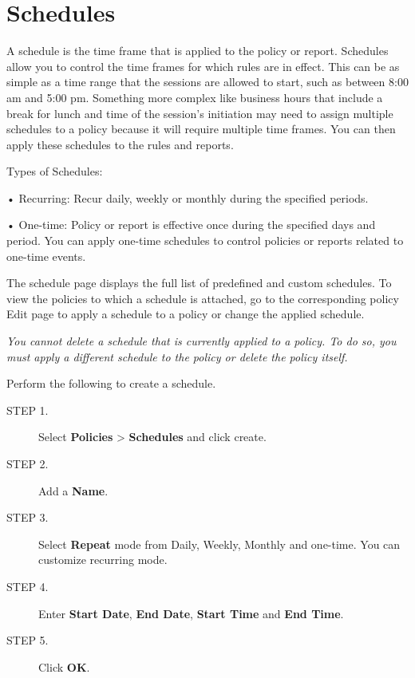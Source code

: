 \section*{\hypertarget{link:Schedules}{Schedules}}
\label{sec:policies:schedules}

A schedule is the time frame that is applied to the policy or report. Schedules allow you to control the time frames for which rules are in effect. 
This can be as simple as a time range that the sessions are allowed to start, such as between 8:00 am and 5:00 pm. 
Something more complex like business hours that include a break for lunch and time of the session’s initiation may need to assign multiple schedules to a policy because it will require multiple time frames. You can then apply these schedules to the rules and reports.


Types of Schedules:


• Recurring: Recur daily, weekly or monthly during the specified periods. 


• One-time: Policy or report is effective once during the specified days and period. You can apply one-time schedules to control policies or reports related to one-time events. 


The schedule page displays the full list of predefined and custom schedules. To view the policies to which a schedule is attached, 
go to the corresponding policy Edit page to apply a schedule to a policy or change the applied schedule. 


\notemark\textit{You cannot delete a schedule that is currently applied to a policy. To do so, you must apply a different schedule to the policy or delete the policy itself.}


Perform the following to create a schedule.


\begin{description}
    \item[STEP 1.]	Select \textbf{Policies} > \textbf{Schedules} and click create.
    \item[STEP 2.]	Add a \textbf{Name}.
    \item[STEP 3.]	Select \textbf{Repeat} mode from Daily, Weekly, Monthly and one-time. You can customize recurring mode.
    \item[STEP 4.]	Enter \textbf{Start Date}, \textbf{End Date}, \textbf{Start Time} and \textbf{End Time}.
    \item[STEP 5.]	Click \textbf{OK}. 
\end{description}    

